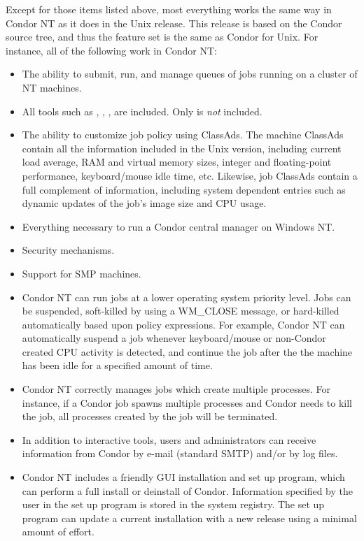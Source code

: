 Except for those items listed above, most everything works
the same way in Condor NT as it does in the Unix release.
This release is based on the Condor \VersionNotice source tree, and thus the
feature set is the same as Condor \VersionNotice for Unix.  
For instance, all of the following work in Condor NT:
\begin{itemize}

\item The ability to submit, run, and manage queues of jobs running on a
cluster of NT machines.

\item All tools such as , , ,
are included. Only  is
\emph{not} included.

\item The ability to customize job policy using ClassAds.
The machine ClassAds contain all the information included in the Unix version,
including current load average, RAM and virtual memory sizes, integer and
floating-point performance, keyboard/mouse idle time, etc.  Likewise, job
ClassAds contain a full complement of information, including system
dependent entries such as dynamic updates of the job's image size and CPU
usage.

\item Everything necessary to run a Condor central manager on Windows NT.

\item Security mechanisms.

\item Support for SMP machines.

\item Condor NT can run jobs at a lower operating system priority level.
Jobs can be suspended, soft-killed by using a WM\_CLOSE message,
or hard-killed automatically based upon policy expressions.
For example, Condor NT can automatically suspend a job
whenever keyboard/mouse or non-Condor created CPU activity is detected, and
continue the job after the the machine has been idle for a specified amount
of time.

\item Condor NT correctly manages jobs which create multiple processes.  For
instance, if a Condor job spawns multiple processes and Condor
needs to kill the job,
all processes created by the job will be terminated.

\item In addition to interactive tools, users and administrators can receive
information from Condor by e-mail (standard SMTP) and/or by log files.

\item Condor NT includes a friendly GUI installation and set up program,
which can perform a full install or deinstall of Condor.
Information specified by the user in the set up program is stored in the
system registry.  
The set up program can update a current installation with a
new release using a minimal amount of effort.

\end{itemize}


